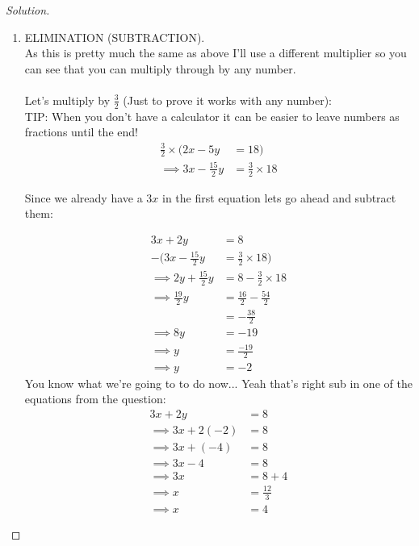 \documentclass[12pt]{article}
\newenvironment{solution}{\begin{proof}[Solution]}{\end{proof}}
\begin{document}
\begin{solution}
\begin{enumerate}
    \item ELIMINATION (SUBTRACTION). \\
        As this is pretty much the same as above I'll use a different multiplier so you can see that you can multiply through by any number. \\
        \\
        Let's multiply by $\frac{3}{2}$ (Just to prove it works with any number): \\
        TIP: When you don't have a calculator it can be easier to leave numbers as fractions until the  end! \\
        \begin{align*}
            \frac{3}{2} \times (2x - 5y &= 18) \\
            \implies 3x - \frac{15}{2}y &= \frac{3}{2} \times 18 
        \end{align*}
        
        Since we already have a $3x$ in the first equation lets go ahead and subtract them:
        
        \begin{align*}
            3x + 2y &= 8 \\
            - (3x - \frac{15}{2}y &= \frac{3}{2} \times 18) \\
            \implies 2y + \frac{15}{2}y &= 8 - \frac{3}{2} \times 18 \\
            \implies \frac{19}{2}y &= \frac{16}{2} - \frac{54}{2} \\
                                     &= - \frac{38}{2} \\
            \implies 8y &= -19 \\
            \implies y &= \frac{-19}{2} \\
            \implies y &= -2
        \end{align*}
    You know what we're going to to do now... Yeah that's right sub in one of the equations from the question: \\
    
        \begin{align*}
            3x + 2y &= 8 \\
            \implies 3x + 2(-2) &= 8 \\
            \implies 3x + (-4) &= 8 \\
            \implies 3x - 4 &= 8 \\
            \implies 3x &= 8 + 4 \\
            \implies x &= \frac{12}{3} \\
            \implies x &= 4
        \end{align*}
    

\end{enumerate}
\end{solution}
\end{document}
